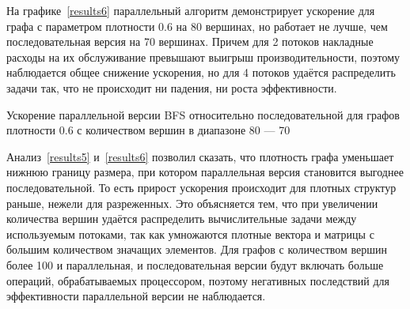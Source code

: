 На графике~\ref{results6} параллельный алгоритм демонстрирует ускорение для графа с параметром плотности 0.6 на 80 вершинах, но работает не лучше, чем последовательная версия на 70 вершинах. Причем для 2 потоков накладные расходы на их обслуживание превышают выигрыш производительности, поэтому наблюдается общее снижение ускорения, но для 4 потоков удаётся распределить задачи так, что не происходит ни падения, ни роста эффективности.

\begin{table}
  \centering

\caption{Ускорение параллельной версии BFS относительно последовательной для графов плотности 0.6 с количеством вершин в диапазоне 80 --- 70}
\label{results6}
\end{table}

Анализ~\ref{results5} и~\ref{results6} позволил сказать, что плотность графа уменьшает нижнюю границу размера, при котором параллельная версия становится выгоднее последовательной. То есть прирост ускорения происходит для плотных структур раньше, нежели для разреженных.
Это объясняется тем, что при увеличении количества вершин удаётся распределить вычислительные задачи между используемым потоками, так как умножаются плотные вектора и матрицы с большим количеством значащих элементов. Для графов с количеством вершин более 100 и параллельная, и последовательная версии будут включать больше операций, обрабатываемых процессором, поэтому негативных последствий для эффективности параллельной версии не наблюдается.